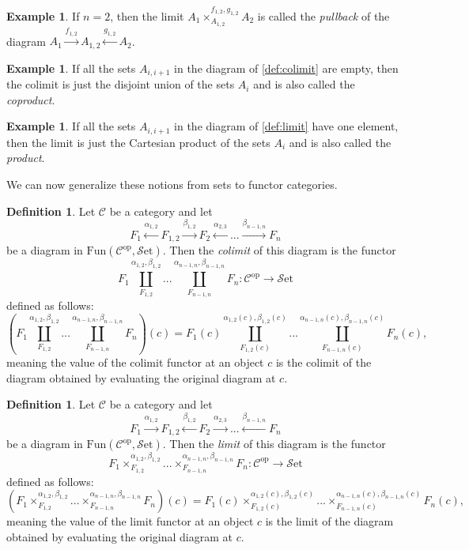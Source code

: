 \documentclass[11pt, a4paper]{amsart}
\newcommand{\cC}{\mathcal{C}}
\newcommand{\op}{\mathrm{op}}
\newcommand{\Fun}{\mathrm{Fun}}
\newcommand{\Set}{\mathscr{S}\mathrm{et}}
\theoremstyle{definition}
\newtheorem{definition}[equation]{Definition}
\newtheorem{example}[equation]{Example}
\theoremstyle{remark}
\numberwithin{equation}{section}
\begin{document}
\begin{example} \label{ex:pullback}
  If $n = 2$, then the limit $A_1 \times_{A_{1,2}}^{f_{1,2},g_{1,2}} A_2$ is called the \emph{pullback} of the diagram $A_1 \xrightarrow{f_{1,2}} A_{1,2} \xleftarrow{g_{1,2}} A_2$.
\end{example}

\begin{example} \label{ex:coproduct}
 If all the sets $A_{i,i+1}$ in the diagram of \cref{def:colimit} are empty, then the colimit is just the disjoint union of the sets $A_i$ and is also called the \emph{coproduct}.
\end{example}

\begin{example} \label{ex:product}
 If all the sets $A_{i,i+1}$ in the diagram of \cref{def:limit} have one element, then the limit is just the Cartesian product of the sets $A_i$ and is also called the \emph{product}.
\end{example}

We can now generalize these notions from sets to functor categories.

\begin{definition} \label{def:colimit functor}
  Let $\cC$ be a category and let 
  \[F_1 \xleftarrow{\alpha_{1,2}} F_{1,2} \xrightarrow{\beta_{1,2}} F_{2} \xleftarrow{\alpha_{2,3}}  ... \xrightarrow{\beta_{n-1,n}} F_n\] 
  be a diagram in $\Fun(\cC^{\op},\Set)$. Then the \emph{colimit} of this diagram is the functor 
  \[F_1 \coprod_{F_{1,2}}^{\alpha_{1,2},\beta_{1,2}} ... \coprod_{F_{n-1, n}}^{\alpha_{n-1, n},\beta_{n-1, n}} F_n\colon \cC^{\op} \to \Set\] 
  defined as follows:
  \[(F_1 \coprod_{F_{1,2}}^{\alpha_{1,2},\beta_{1,2}} ... \coprod_{F_{n-1, n}}^{\alpha_{n-1, n},\beta_{n-1, n}} F_n)(c) = F_1(c) \coprod_{F_{1,2}(c)}^{\alpha_{1,2}(c),\beta_{1,2}(c)} ... \coprod_{F_{n-1, n}(c)}^{\alpha_{n-1, n}(c),\beta_{n-1, n}(c)} F_n(c),\]
  meaning the value of the colimit functor at an object $c$ is the colimit of the diagram obtained by evaluating the original diagram at $c$.
\end{definition}

\begin{definition} \label{def:limit functor}
  Let $\cC$ be a category and let 
  \[F_1 \xrightarrow{\alpha_{1,2}} F_{1,2} \xleftarrow{\beta_{1,2}} F_{2} \xrightarrow{\alpha_{2,3}}  ... \xleftarrow{\beta_{n-1,n}} F_n\] 
  be a diagram in $\Fun(\cC^{\op},\Set)$. Then the \emph{limit} of this diagram is the functor 
  \[F_1 \times_{F_{1,2}}^{\alpha_{1,2},\beta_{1,2}} ... \times_{F_{n-1, n}}^{\alpha_{n-1, n},\beta_{n-1, n}} F_n\colon \cC^{\op} \to \Set\] 
  defined as follows:
  \[(F_1 \times_{F_{1,2}}^{\alpha_{1,2},\beta_{1,2}} ... \times_{F_{n-1, n}}^{\alpha_{n-1, n},\beta_{n-1, n}} F_n)(c) = F_1(c) \times_{F_{1,2}(c)}^{\alpha_{1,2}(c),\beta_{1,2}(c)} ... \times_{F_{n-1, n}(c)}^{\alpha_{n-1, n}(c),\beta_{n-1, n}(c)} F_n(c),\]
  meaning the value of the limit functor at an object $c$ is the limit of the diagram obtained by evaluating the original diagram at $c$.
\end{definition}
\end{document}
